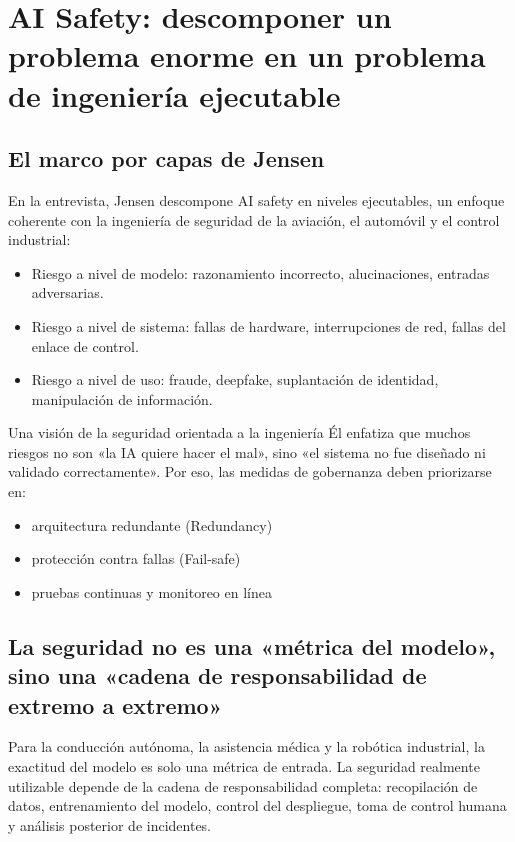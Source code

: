 \section{AI Safety: descomponer un problema enorme en un problema de ingeniería ejecutable}

\subsection{El marco por capas de Jensen}

En la entrevista, Jensen descompone AI safety en niveles ejecutables, un enfoque coherente con la ingeniería de seguridad de la aviación, el automóvil y el control industrial:
\begin{itemize}
    \item Riesgo a nivel de modelo: razonamiento incorrecto, alucinaciones, entradas adversarias.
    \item Riesgo a nivel de sistema: fallas de hardware, interrupciones de red, fallas del enlace de control.
    \item Riesgo a nivel de uso: fraude, deepfake, suplantación de identidad, manipulación de información.
\end{itemize}

\begin{importantbox}{Una visión de la seguridad orientada a la ingeniería}
Él enfatiza que muchos riesgos no son «la IA quiere hacer el mal», sino «el sistema no fue diseñado ni validado correctamente». Por eso, las medidas de gobernanza deben priorizarse en:
\begin{itemize}
    \item arquitectura redundante (Redundancy)
    \item protección contra fallas (Fail-safe)
    \item pruebas continuas y monitoreo en línea
\end{itemize}
\end{importantbox}

\subsection{La seguridad no es una «métrica del modelo», sino una «cadena de responsabilidad de extremo a extremo»}

Para la conducción autónoma, la asistencia médica y la robótica industrial, la exactitud del modelo es solo una métrica de entrada. La seguridad realmente utilizable depende de la cadena de responsabilidad completa: recopilación de datos, entrenamiento del modelo, control del despliegue, toma de control humana y análisis posterior de incidentes.


